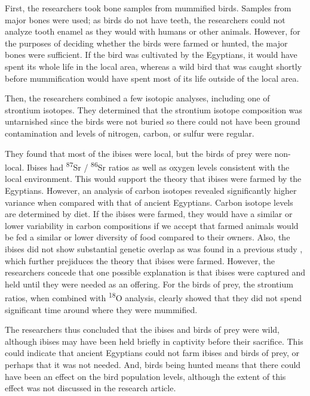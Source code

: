 \documentclass[a4paper, 12pt]{article}
\begin{document}
First, the researchers took bone samples from mummified birds. Samples from major bones were used;
as birds do not have teeth, the researchers could not analyze tooth enamel as they would
with humans or other animals. However, for the purposes of deciding whether the birds
were farmed or hunted, the major bones were sufficient. If the bird was cultivated by the
Egyptians, it would have spent its whole life in the local area, whereas a wild bird
that was caught shortly before mummification would have spent most of its life outside
of the local area.

Then, the researchers combined a few isotopic analyses, including one of strontium isotopes.
They determined that the strontium isotope composition was untarnished since the birds were not
buried so there could not have been ground contamination and levels
of nitrogen, carbon, or sulfur were regular.


They found that most of the ibises were local, but the birds of prey were non-local.
Ibises had \textsuperscript{87}Sr / \textsuperscript{86}Sr ratios
as well as oxygen levels consistent with the local environment. This would support the theory that
ibises were farmed by the Egyptians. However, an analysis of carbon isotopes revealed
significantly higher variance when compared with that of ancient Egyptians. Carbon isotope
levels are determined by diet. If the ibises were farmed, they would have a similar or lower variability in carbon compositions
if we accept that farmed animals would be fed a similar or lower diversity of food compared to
their owners. Also, the ibises did not show substantial genetic overlap as was found in a previous study \citep{wasef2019}, which
further prejiduces the theory that ibises were farmed. However, the researchers concede
that one possible explanation is that ibises were captured and held until they were
needed as an offering.
For the birds of prey, the strontium ratios, when combined with \textsuperscript{18}O analysis, clearly
showed that they did not spend significant time around where they
were mummified.

The researchers thus concluded that the ibises and birds of prey were wild, although
ibises may have been held briefly in captivity before their sacrifice. This could indicate
that ancient Egyptians could not farm ibises and birds of prey, or perhaps that
it was not needed. And, birds being hunted means that there could have been an effect
on the bird population levels, although the extent of this effect was not discussed
in the research article.
\end{document}
